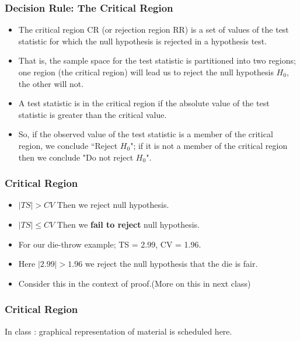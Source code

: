 ﻿\documentclass[a4]{beamer}
\begin{document}

\begin{frame}
\frametitle{Decision Rule:  The Critical Region}
\begin{itemize}
\item The critical region CR (or rejection region RR) is a set of values of the test statistic for which the null hypothesis is rejected in a hypothesis test. \item That is, the sample space for the test statistic is partitioned into two regions; one region (the critical region) will lead us to reject the null hypothesis $H_0$, the other will not.

\item A test statistic is in the critical region if the absolute value of the test statistic is greater than the critical value.
    \item So, if the observed value of the test statistic is a member of the critical region, we conclude ``Reject $H_0$"; if it is not a member of the critical region then we conclude "Do not reject $H_0$".
\end{itemize}
\end{frame}


\begin{frame}
\frametitle{Critical Region}
\begin{itemize}

\item $|TS| > CV$ Then we reject null hypothesis.
\item $|TS| \leq CV$ Then we \textbf{fail to reject} null hypothesis.

\item For our die-throw example; TS = 2.99, CV = 1.96.
\item Here $|2.99| > 1.96$ we reject the null hypothesis that the die is fair.
\item Consider this in the context of proof.(More on this in next class)
\end{itemize}
\end{frame}

\begin{frame}
\frametitle{Critical Region}
In class : graphical representation of material is scheduled here.
\end{frame}
\end{document}
